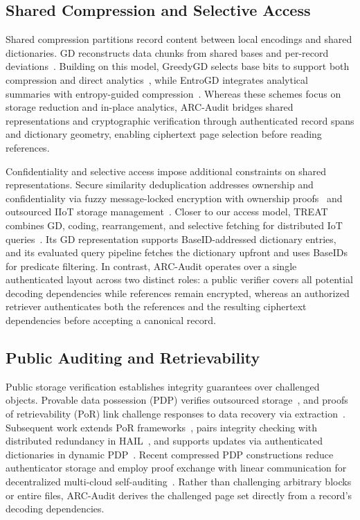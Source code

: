 \documentclass[10pt,journal]{IEEEtran}
\begin{document}
\subsection{Shared Compression and Selective Access}
Shared compression partitions record content between local encodings and shared dictionaries. GD reconstructs data chunks from shared bases and per-record deviations~\cite{Talasila2019}. Building on this model, GreedyGD selects base bits to support both compression and direct analytics~\cite{Hurst2024GreedyGD}, while EntroGD integrates analytical summaries with entropy-guided compression~\cite{Zhao2026EntroGD}. Whereas these schemes focus on storage reduction and in-place analytics, ARC-Audit bridges shared representations and cryptographic verification through authenticated record spans and dictionary geometry, enabling ciphertext page selection before reading references.

Confidentiality and selective access impose additional constraints on shared representations. Secure similarity deduplication addresses ownership and confidentiality via fuzzy message-locked encryption with ownership proofs~\cite{Jiang2023FuzzyDedup} and outsourced IIoT storage management~\cite{Gao2024}. Closer to our access model, TREAT combines GD, coding, rearrangement, and selective fetching for distributed IoT queries~\cite{Taurone2024TREAT}. Its GD representation supports BaseID-addressed dictionary entries, and its evaluated query pipeline fetches the dictionary upfront and uses BaseIDs for predicate filtering. In contrast, ARC-Audit operates over a single authenticated layout across two distinct roles: a public verifier covers all potential decoding dependencies while references remain encrypted, whereas an authorized retriever authenticates both the references and the resulting ciphertext dependencies before accepting a canonical record.

\subsection{Public Auditing and Retrievability}
Public storage verification establishes integrity guarantees over challenged objects. Provable data possession (PDP) verifies outsourced storage~\cite{Ateniese2007PDP}, and proofs of retrievability (PoR) link challenge responses to data recovery via extraction~\cite{Juels2007POR,ShachamWaters2013}. Subsequent work extends PoR frameworks~\cite{Bowers2009PORTheory}, pairs integrity checking with distributed redundancy in HAIL~\cite{Bowers2009HAIL}, and supports updates via authenticated dictionaries in dynamic PDP~\cite{Erway2009DPDP}. Recent compressed PDP constructions reduce authenticator storage and employ proof exchange with linear communication for decentralized multi-cloud self-auditing~\cite{Yang2025CompressedPDP}. Rather than challenging arbitrary blocks or entire files, ARC-Audit derives the challenged page set directly from a record's decoding dependencies.
\end{document}
